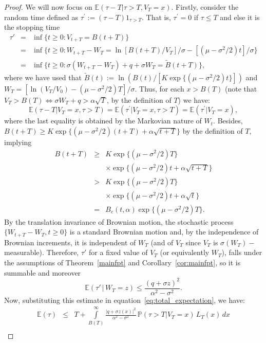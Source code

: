 \documentclass[12pt]{article}
\theoremstyle{definition}
\begin{document}
\begin{proof}
We will now focus on $\mathbb{E}(\tau-T\vert\tau>T,V_T=x)$. 
Firstly, consider the random time defined as $\tau^\prime:=(\tau-T)1_{\tau>T}$. That is, $\tau^\prime=0$ if $\tau \leq T$ and else it is the stopping time
\begin{eqnarray}\nonumber
\tau' &=& \inf \{ t \ge 0 : V_{t+T}=B(t+T)\}\\ \nonumber
&=&  \inf \{ t \ge 0 : W_{t+T}-W_{T} = \ln[B(t+T)/V_T]/\sigma - \left[(\mu - \sigma^2/2)t \right]/\sigma \}\\ \nonumber
&=&  \inf \{ t \ge 0 : \sigma(W_{t+T}-W_{T})+q+\sigma W_T = \tilde{B}(t+T)\},
\end{eqnarray}
where we have used that $\tilde{B}(t):=\ln\left(B(t)/[K \exp\{(\mu-\sigma^2/2)t\}]\right)$ and $W_T=[\ln(V_T/V_0)-(\mu-\sigma^2/2)T]/\sigma$. Thus, for each $x>B(T)$ (note that $V_T>B(T)\Leftrightarrow \sigma W_T +q> \alpha\sqrt{T}$, by the definition of $T$) we have:
$$
\mathbb{E}(\tau-T\vert V_T=x,\tau>T) =\mathbb{E}(\tau^\prime\vert V_T=x,\tau>T)=\mathbb{E}(\tau^\prime\vert V_T=x),
$$ 
where the last equality is obtained by the Markovian nature of $W_t$. Besides, $B(t+T)\geq K \exp\{(\mu-\sigma^2/2)(t+T)+\alpha\sqrt{t+T}\}$ by the definition of $T$, implying
\begin{eqnarray}\nonumber
B(t+T) &\geq& K \exp\{(\mu-\sigma^2/2)T\} \\ \nonumber
&& \times
\exp\{(\mu-\sigma^2/2)t+\alpha \sqrt{t+T}\} \\ \nonumber
 &>& K \exp\{(\mu-\sigma^2/2)T\} \\ \nonumber
&& \times
\exp\{(\mu-\sigma^2/2)t+\alpha \sqrt{t}\} \\ \nonumber
&=& B_c(t,\alpha) \exp\{(\mu-\sigma^2/2)T\}.
\end{eqnarray}
By the translation invariance of Brownian motion, the stochastic process
$\{W_{t+T}-W_{T},t \ge 0\}$ is a standard Brownian motion and, by the independence of Brownian increments, it is independent of $W_T$ (and of $V_T$ since $V_T$ is $\sigma(W_T)-$measurable). Therefore, $\tau'$ for a fixed value of $V_T$ (or equivalently $W_T$), falls under the assumptions of Theorem~\ref{mainfpt} and Corollary~\ref{cor:mainfpt}, 
so it is summable and moreover
$$
\mathbb{E}(\tau' \, \vert \, W_T=z) \le \frac{(q +\sigma z)^2}{\alpha^2 - \sigma^2}.
$$
Now, substituting this estimate in equation~\eqref{eq:total_expectation}, we have:
\begin{eqnarray}
\label{eq:for_lemma}
\nonumber
\mathbb{E}(\tau) &\le& T + \int\limits_{B(T)}^\infty\frac{|q+\sigma z(x)|^2}{\alpha^2 - \sigma^2} \, \mathbb{P}(\tau>T\vert V_T=x) \, L_T(x) \, dx \\

\end{eqnarray}
\end{proof}
\end{document}
